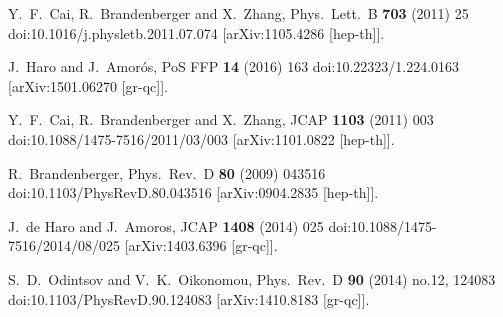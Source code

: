 \documentclass{article}
\begin{document}
\begin{thebibliography}{99}

Y.~F.~Cai, R.~Brandenberger and X.~Zhang,
Phys.\ Lett.\ B {\bf 703} (2011) 25
doi:10.1016/j.physletb.2011.07.074
[arXiv:1105.4286 [hep-th]].


J.~Haro and J.~Amor\' os,
PoS FFP {\bf 14} (2016) 163
doi:10.22323/1.224.0163
[arXiv:1501.06270 [gr-qc]].

Y.~F.~Cai, R.~Brandenberger and X.~Zhang,
JCAP {\bf 1103} (2011) 003
doi:10.1088/1475-7516/2011/03/003
[arXiv:1101.0822 [hep-th]].









R.~Brandenberger,
Phys.\ Rev.\ D {\bf 80} (2009) 043516
doi:10.1103/PhysRevD.80.043516
[arXiv:0904.2835 [hep-th]].

J.~de Haro and J.~Amoros,
JCAP {\bf 1408} (2014) 025
doi:10.1088/1475-7516/2014/08/025
[arXiv:1403.6396 [gr-qc]].


S.~D.~Odintsov and V.~K.~Oikonomou,
Phys.\ Rev.\ D {\bf 90} (2014) no.12, 124083
doi:10.1103/PhysRevD.90.124083
[arXiv:1410.8183 [gr-qc]].




\end{thebibliography}
\end{document}
